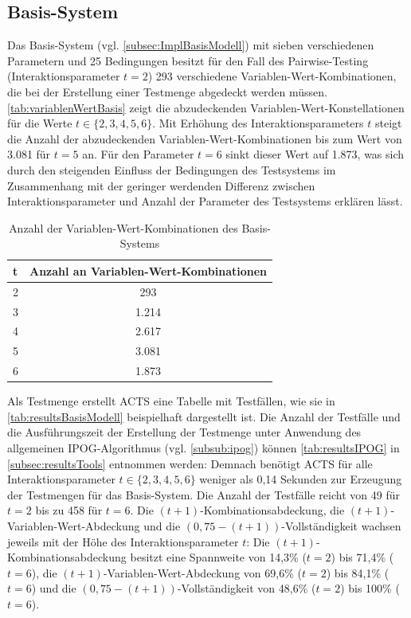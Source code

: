 \subsection{Basis-System}\label{subsec:resultsBasisModell}

Das Basis-System (vgl. \autoref{subsec:ImplBasisModell}) mit sieben verschiedenen Parametern und 25 Bedingungen besitzt für den Fall des Pairwise-Testing (Interaktionsparameter $t=2$) 293 verschiedene Variablen-Wert-Kombinationen, die bei der Erstellung einer Testmenge abgedeckt werden müssen. \autoref{tab:variablenWertBasis} zeigt die abzudeckenden Variablen-Wert-Konstellationen für die Werte $t \in \{2,3,4,5,6\}$. Mit Erhöhung des Interaktionsparameters $t$ steigt die Anzahl der abzudeckenden Variablen-Wert-Kombinationen bis zum Wert von 3.081 für $t=5$ an. Für den Parameter $t=6$ sinkt dieser Wert auf 1.873, was sich durch den steigenden Einfluss der Bedingungen des Testsystems im Zusammenhang mit der geringer werdenden Differenz zwischen Interaktionsparameter und Anzahl der Parameter des Testsystems erklären lässt.

\renewcommand{\arraystretch}{2}
\begin{table}[!htb]
\footnotesize
\begin{tabular}{|M{0.1\textwidth}|c|}
\hline
{}t & Anzahl an Variablen-Wert-Kombinationen \\  & 293                                    \\  & 1.214                                   \\  & 2.617                                   \\  & 3.081                                   \\  & 1.873                                   \\ \hline
\end{tabular}
\normalsize
\caption{Anzahl der Variablen-Wert-Kombinationen des Basis-Systems}
\label{tab:variablenWertBasis}
\end{table}
\renewcommand{\arraystretch}{1.5}

Als Testmenge erstellt ACTS eine Tabelle mit Testfällen, wie sie in \autoref{tab:resultsBasisModell} beispielhaft dargestellt ist. Die Anzahl der Testfälle und die Ausführungszeit der Erstellung der Testmenge unter Anwendung des allgemeinen IPOG-Algorithmus (vgl. \autoref{subsub:ipog}) können \autoref{tab:resultsIPOG} in \autoref{subsec:resultsTools} entnommen werden: Demnach benötigt ACTS für alle Interaktionsparameter $t \in \{2,3,4,5,6\}$ weniger als 0,14 Sekunden zur Erzeugung der Testmengen für das Basis-System. Die Anzahl der Testfälle reicht von 49 für $t=2$ bis zu 458 für $t=6$. Die $(t+1)$-Kombinationsabdeckung, die $(t+1)$-Variablen-Wert-Abdeckung und die $(0,75-(t+1))$-Vollständigkeit wachsen jeweils mit der Höhe des Interaktionsparameter $t$: Die $(t+1)$-Kombinationsabdeckung besitzt eine Spannweite von 14,3\% ($t=2$) bis 71,4\% ($t=6$), die $(t+1)$-Variablen-Wert-Abdeckung von 69,6\% ($t=2$) bis 84,1\% ($t=6$) und die $(0,75-(t+1))$-Vollständigkeit von 48,6\% ($t=2$) bis 100\% ($t=6$).


